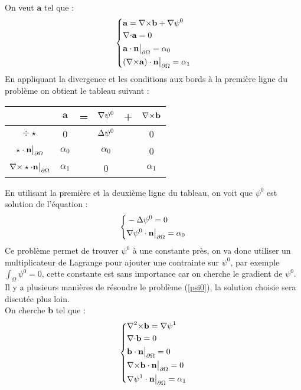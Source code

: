 On veut $\mathbf{a}$ tel que :
\begin{equation}\label{a}
\left\{\begin{aligned}
&\mathbf{a}={\nabla\times} \mathbf{b}+{\nabla}\psi^0\\
&{\nabla\cdot} \mathbf{a} =0\\
&\mathbf{a}\cdot \mathbf{n}{\big\rvert_{\partial\Omega}} = \alpha_0\\
&({\nabla\times} \mathbf{a})\cdot \mathbf{n}{\big\rvert_{\partial\Omega}} = \alpha_1
\end{aligned}\right.
\end{equation}
En appliquant la divergence et les conditions aux bords à la première ligne du problème on obtient le tableau suivant :
\begin{center}
\begin{tabular}{c|ccccc}
& $\mathbf{a}$ & = & ${\nabla}\psi^0$ & + & ${\nabla\times} \mathbf{b}$ \\ \hline
$\div\star$ & 0 & & ${\Delta}\psi^0$ & & 0\\ \hline
$\star\cdot \mathbf{n}{\big\rvert_{\partial\Omega}}$ & $\alpha_0$ & & $\alpha_0$ & & 0\\ \hline
${\nabla\times}\star\cdot \mathbf{n}{\big\rvert_{\partial\Omega}}$ & $\alpha_1$ & & 0 & & $\alpha_1$
\end{tabular}
\end{center}
En utilisant la première et la deuxième ligne du tableau, on voit que $\psi^0$ est solution de l'équation :
\begin{equation}\label{psi0}
\left\{\begin{aligned}
&-{\Delta}\psi^0 = 0\\
&{\nabla}\psi^0\cdot \mathbf{n}{\big\rvert_{\partial\Omega}}=\alpha_0
\end{aligned}\right.
\end{equation}
Ce problème permet de trouver $\psi^0$ à une constante près, on va donc utiliser un multiplicateur de Lagrange pour ajouter une contrainte sur $\psi^0$, par exemple $\int_\Omega \psi^0 = 0$, cette constante est sans importance car on cherche le gradient de $\psi^0$.\\
Il y a plusieurs manières de résoudre le problème (\ref{psi0}), la solution choisie sera discutée plus loin.\\

On cherche $\mathbf{b}$ tel que :
\begin{equation}\label{curlb}
\left\{\begin{aligned}
&{\nabla^2\times} \mathbf{b} = {\nabla}\psi^1\\
&{\nabla\cdot} \mathbf{b} = 0\\
&\mathbf{b}\cdot \mathbf{n}{\big\rvert_{\partial\Omega}} = 0\\
&{\nabla\times} \mathbf{b}\cdot \mathbf{n}{\big\rvert_{\partial\Omega}} = 0\\
&{\nabla}\psi^1\cdot \mathbf{n}{\big\rvert_{\partial\Omega}} = \alpha_1
\end{aligned}\right.
\end{equation}

